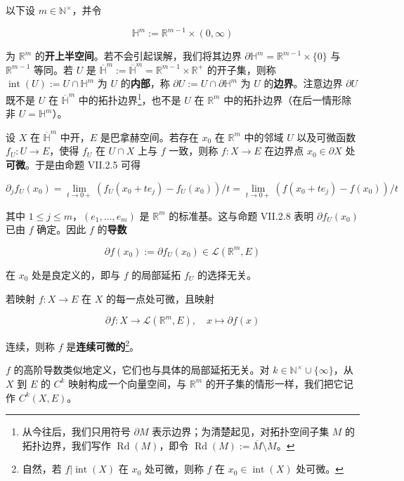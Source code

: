 以下设 $ m \in \mathbb{N}^{\times} $，并令

\[
\mathbb{H}^m := \mathbb{R}^{m-1}\times(0,\infty)
\]

为 $ \mathbb{R}^m $ 的\textbf{开上半空间}。若不会引起误解，我们将其边界 $ \partial\mathbb{H}^m = \mathbb{R}^{m-1}\times\{0\} $ 与 $ \mathbb{R}^{m-1} $ 等同。若 $ U $ 是 $ \overline{\mathbb{H}}^m := \overline{\mathbb{H}}^m = \mathbb{R}^{m-1}\times\mathbb{R}^{+} $ 的开子集，则称 $ \operatorname{int}(U) := U\cap\mathbb{H}^m $ 为 $ U $ 的\textbf{内部}，称 $ \partial U := U\cap\partial\mathbb{H}^m $ 为 $ U $ 的\textbf{边界}。注意边界 $ \partial U $ 既不是 $ U $ 在 $ \overline{\mathbb{H}}^m $ 中的拓扑边界\footnote{从今往后，我们只用符号 $ \partial M $ 表示边界；为清楚起见，对拓扑空间子集 $ M $ 的拓扑边界，我们写作 $ \operatorname{Rd}(M) $，即令 $ \operatorname{Rd}(M) := \overline{M}\setminus\mathring{M} $。}，也不是 $ U $ 在 $ \mathbb{R}^m $ 中的拓扑边界（在后一情形除非 $ U = \mathbb{H}^m $）。


设 $ X $ 在 $ \overline{\mathbb{H}}^m $ 中开，$ E $ 是巴拿赫空间。若存在 $ x_0 $ 在 $ \mathbb{R}^m $ 中的邻域 $ U $ 以及可微函数 $ f_U : U \to E $，使得 $ f_U $ 在 $ U\cap X $ 上与 $ f $ 一致，则称 $ f : X \to E $ 在边界点 $ x_0 \in \partial X $ 处\textbf{可微}。于是由命题 VII.2.5 可得

\[
\partial_j f_U(x_0) = \lim_{t \to 0+} \left(f_U(x_0 + te_j) - f_U(x_0)\right)/t = \lim_{t \to 0+} \left(f(x_0 + te_j) - f(x_0)\right)/t
\]

其中 $ 1 \le j \le m $，$ (e_1,\ldots,e_m) $ 是 $ \mathbb{R}^m $ 的标准基。这与命题 VII.2.8 表明 $ \partial f_U(x_0) $ 已由 $ f $ 确定。因此 $ f $ 的\textbf{导数}

\[
\partial f(x_0) := \partial f_U(x_0) \in \mathcal{L}(\mathbb{R}^m,E)
\]

在 $ x_0 $ 处是良定义的，即与 $ f $ 的局部延拓 $ f_U $ 的选择无关。

若映射 $ f : X \to E $ 在 $ X $ 的每一点处可微，且映射

\[
\partial f : X \to \mathcal{L}(\mathbb{R}^m,E) ,\quad x \mapsto \partial f(x)
\]

连续，则称 $ f $ 是\textbf{连续可微的}\footnote{自然，若 $ f|\operatorname{int}(X) $ 在 $ x_0 $ 处可微，则称 $ f $ 在 $ x_0 \in \operatorname{int}(X) $ 处可微。}。

$ f $ 的高阶导数类似地定义，它们也与具体的局部延拓无关。对 $ k \in \mathbb{N}^{\times}\cup\{\infty\} $，从 $ X $ 到 $ E $ 的 $ C^k $ 映射构成一个向量空间，与 $ \mathbb{R}^m $ 的开子集的情形一样，我们把它记作 $ C^k(X,E) $。

